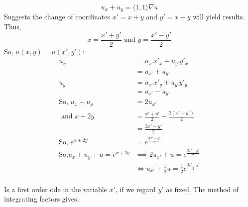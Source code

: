 \documentclass{article}
\begin{document}
\[u_x + u_y = \langle 1,1 \rangle\nabla u\]
Suggests the change of coordinates $x' = x+y$ and $y' = x-y$ will
yield results.  Thus,
\[x = \frac{x'+y'}{2}\text{ and } y = \frac{x'-y'}{2}\]
So, $u(x,y) = u(x',y'):$
\begin{align*}
  u_x &= u_{x'}x'_x + u_{y'}y'_x\\
      &= u_{x'} + u_{y'}\\
  u_y &= u_{x'}x'_y + u_{y'}y'_y\\
      &= u_{x'} - u_{y'}\\
  \text{So, }u_x+u_y &= 2u_{x'}\\
  \text{ and }x+2y  &= \frac{x'+y'}{2} +\frac{2(x'-y')}{2}\\
      &=\frac{3x'-y'}{2}\\
  \text{So, } e^{x+2y} &= e^{\frac{3x'-y'}{2}}\\
  \text{So,} u_x+u_y +u = e^{x+2y} &\implies  2u_{x'} + u =
                                     e^{\frac{3x'-y'}{2}}\\
      &\iff  u_{x'} +\frac{1}{2}u =
                                    \frac{1}{2}e^{\frac{3x'-y'}{2}}\\
\end{align*}

Is a first order ode in the variable $x'$, if we regard $y'$ as
fixed. The method of integrating factors gives,
\end{document}

